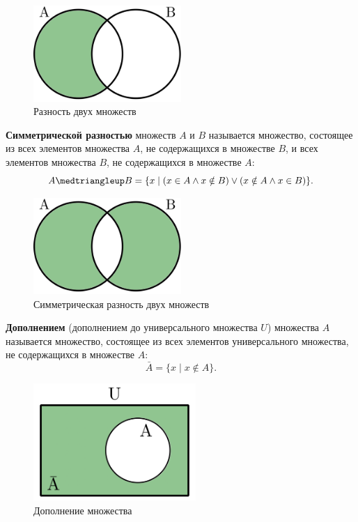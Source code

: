 \documentclass[a5paper, 11pt]{extarticle}
\theoremstyle{definition}
\theoremstyle{definition}
\theoremstyle{definition}
\numberwithin{figure}{section}
\numberwithin{table}{section}
\newcommand{\symdiff}{\medtriangleup}
\begin{document}
\begin{figure}[H]
    \centering
    \includegraphics[width=0.5\textwidth]{images/set-difference.png}
    \caption{Разность двух множеств}
\end{figure}

\textbf{Симметрической разностью} множеств \(A\) и \(B\) называется множество, состоящее из всех элементов множества \(A\), не содержащихся в множестве \(B\), и всех элементов множества \(B\), не содержащихся в множестве \(A\):
\[
    A \symdiff B = \{x \mid (x \in A \land x \notin B) \lor (x \notin A \land x \in B)\}.
\]

\begin{figure}[H]
    \centering
    \includegraphics[width=0.5\textwidth]{images/set-sym-difference.png}
    \caption{Симметрическая разность двух множеств}
\end{figure}

\textbf{Дополнением} (дополнением до универсального множества \(U\)) множества \(A\) называется множество, состоящее из всех элементов универсального множества, не содержащихся в множестве \(A\):
\[
    \bar{A} = \{x \mid x \notin A\}.
\]

\begin{figure}[H]
    \centering
    \includegraphics[width=0.55\textwidth]{images/set-complement.png}
    \caption{Дополнение множества}
\end{figure}
\end{document}
